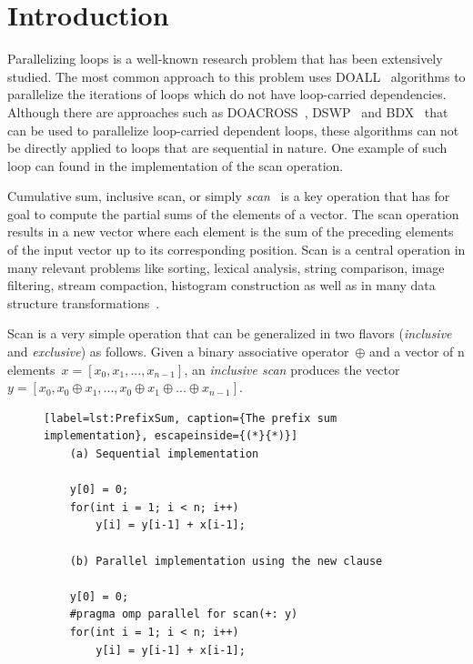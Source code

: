 \documentclass[Ingles]{ic-tese-v1}
\begin{document}
\fimdaspaginasiniciais


\chapter{Introduction}
\label{cap:Introduction}

Parallelizing loops  is a  well-known research  problem that  has been
extensively  studied. The  most common  approach to  this problem  uses
DOALL~\cite{Lamport:1974} algorithms  to parallelize
the iterations of  loops which do not  have loop-carried dependencies.
Although  there  are   approaches  such  as  DOACROSS~\cite{doacross},
DSWP~\cite{Rangan:2004} and  BDX~\cite{Cesar:2015} that
can be  used to parallelize loop-carried dependent  loops, these algorithms
can  not  be  directly  applied   to  loops  that  are  sequential  in
nature. One  example of such loop  can found in the  implementation of
the scan operation.

Cumulative     sum,     inclusive     scan,     or     simply     {\it
scan}~\cite{ScanAsPrimitive} is  a key operation that  has for goal
to compute  the partial  sums of  the elements of  a vector.  The scan
operation results in a new vector where each element is the sum of the
preceding  elements  of  the  input vector  up  to  its  corresponding
position. Scan is a central operation in many  relevant  problems  like  sorting,
lexical  analysis,  string comparison,  image  filtering, stream compaction,
histogram construction as well as  in many data
structure transformations~\cite{BlellochTR90}.

Scan  is a very simple  operation  that can  be generalized
in two flavors (\textit{inclusive} and \textit{exclusive}) as follows.
Given  a binary  associative  operator\  $\oplus$ and  a
vector of  n elements\ $x = [x_{0},  x_{1}, ...  ,x_{n-1}]$,
an   {\em    inclusive   scan}    produces   the    vector
$y =  [ x_{0}, x_{0}  \oplus x_{1},  ... ,x_{0} \oplus  x_{1} \oplus
... \oplus x_{n-1}]$.

\begin{figure}[t]
	\lstset{basicstyle=\scriptsize}
	\begin{lstlisting}[label=lst:PrefixSum, caption={The prefix sum implementation}, escapeinside={(*}{*)}]
	(a) Sequential implementation

	y[0] = 0;
	for(int i = 1; i < n; i++)
		y[i] = y[i-1] + x[i-1];

	(b) Parallel implementation using the new clause

	y[0] = 0;
	#pragma omp parallel for scan(+: y)
	for(int i = 1; i < n; i++)
		y[i] = y[i-1] + x[i-1];
	\end{lstlisting}
	\vspace{-0.7cm}
\end{figure}
\end{document}
